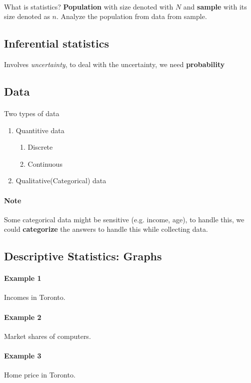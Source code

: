 \documentclass[11pt]{article}
\begin{document}
	\paragraph{} What is statistics? \textbf{Population} with size denoted with $N$ and \textbf{sample} with its size denoted as $n$. Analyze the population from data from sample.
	
	\subsection{Inferential statistics} Involves \emph{uncertainty}, to deal with the uncertainty, we need \textbf{probability}
	
	\subsection{Data}
	\paragraph{}Two types of data
	\begin{enumerate}
		\item Quantitive data
			\begin{enumerate}
				\item Discrete
				\item Continuous
			\end{enumerate}
		\item Qualitative(Categorical) data 
	\end{enumerate}
	\paragraph{Note} Some categorical data might be sensitive (e.g. income, age), to handle this, we could \textbf{categorize} the answers to handle this while collecting data.
	
	\subsection{Descriptive Statistics: Graphs}
	\paragraph{Example 1} Incomes in Toronto.
	\paragraph{Example 2} Market shares of computers.
	\paragraph{Example 3} Home price in Toronto.
\end{document}

